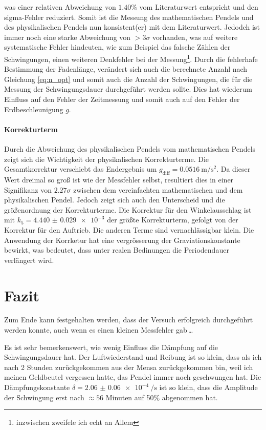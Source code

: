 \documentclass[12pt,a4paper,titlepage]{scrartcl}
\numberwithin{equation}{section}
\numberwithin{table}{section}
\numberwithin{figure}{section}
\begin{document}
was einer relativen Abweichung von $1.40\%$ vom Literaturwert entspricht und den sigma-Fehler reduziert. Somit ist die Messung des mathematischen Pendels und des physikalischen Pendels nun konsistent(er) mit dem Literaturwert.
Jedodch ist immer noch eine starke Abweichung von $>3\sigma$ vorhanden, was auf weitere systematische Fehler hindeuten, wie zum Beispiel das falsche Zählen der Schwingungen, einen weiteren Denkfehler bei der Messung\footnote{inzwischen zweifele ich echt an Allem}. Durch die fehlerhafe Bestimmung der Fadenlänge, verändert sich auch die berechnete Anzahl nach Gleichung \ref{eq:n_opt} und somit auch die Anzahl der Schwingungen, die für die Messung der Schwingungsdauer durchgeführt werden sollte. Dies hat wiederum Einfluss auf den Fehler der Zeitmessung und somit auch auf den Fehler der Erdbeschleunigung $g$. 



\paragraph{Korrekturterm}
Durch die Abweichung des physikalischen Pendels vom mathematischen Pendels zeigt sich die Wichtigkeit der physikalischen Korrekturterme. Die Gesamtkorrektur verschiebt das Endergebnis um $g_\text{diff} = \qty{0.0516}{\meter\per\second\squared}$. Da dieser Wert dreimal so groß ist wie der Messfehler selbst, resultiert dies in einer Signifikanz von $2.27\sigma$ zwischen dem vereinfachten mathematischen und dem physikalischen Pendel. Jedoch zeigt sich auch den Unterscheid und die größenordnung der Korrekturterme. Die Korrektur für den Winkelausschlag ist mit $k_5 = \num{4.440(29)e-3}$ der größte Korrekturterm, gefolgt von der Korrektur für den Auftrieb. Die anderen Terme sind vernachlässigbar klein. Die Anwendung der Korrketur hat eine vergrösserung der Graviationskonstante bewirkt, was bedeutet, dass unter realen Bedinungen die Periodendauer verlängert wird. 

\section{Fazit}
Zum Ende kann festgehalten werden, dass der Versuch erfolgreich durchgeführt werden konnte, auch wenn es einen kleinen Messfehler gab\,\dots

Es ist sehr bemerkenswert, wie wenig Einfluss die Dämpfung auf die Schwingungsdauer hat. Der Luftwiederstand und Reibung ist so klein, dass als ich nach 2 Stunden zurückgekommen aus der Mensa zurückgekommen bin, weil ich meinen Geldbeutel vergessen hatte, das Pendel immer noch geschwungen hat. Die Dämpfungskonstante $\delta = \qty{2.06(6)e-4}{\per\second}$ ist so klein, dass die Amplitude der Schwingung erst nach $\approx 56$ Minuten auf 50\% abgenommen hat.
\end{document}
